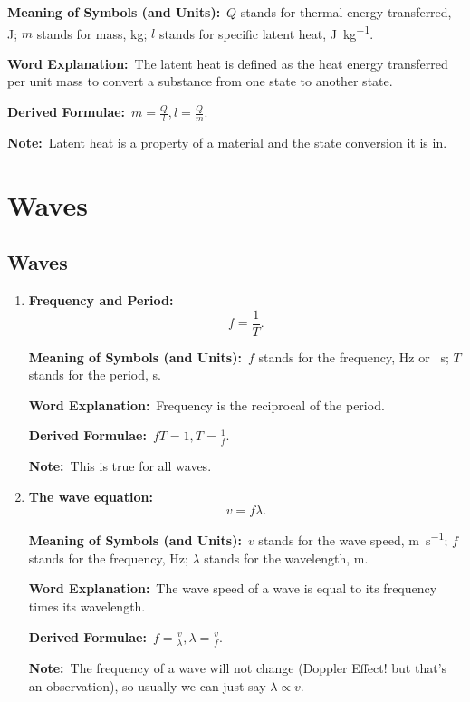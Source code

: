 \documentclass[8pt]{article}
\newcommand{\MeanSymb}{\textbf{Meaning of Symbols (and Units):}\ }
\newcommand{\WordExpl}{\textbf{Word Explanation:}\ }
\newcommand{\DeriForm}{\textbf{Derived Formulae:}\ }
\newcommand{\Note}{\textbf{Note:}\ }
\begin{document}
\begin{enumerate}
                \MeanSymb \(Q\) stands for thermal energy transferred, \unit{\joule}; \(m\) stands for mass, \unit{\kilogram}; \(l\) stands for specific latent heat, \unit{\joule \per \kilogram}.

                \WordExpl The latent heat is defined as the heat energy transferred per unit mass to convert a substance from one state to another state.

                \DeriForm \(m = \frac{Q}{l}, l = \frac{Q}{m}\).

                \Note Latent heat is a property of a material and the state conversion it is in.
                
            \end{enumerate}

    \section{Waves}
        \subsection{Waves}
            \begin{enumerate}
                \item \textbf{Frequency and Period:}
                \[
                    f = \frac{1}{T}.
                \]

                \MeanSymb \(f\) stands for the frequency, \unit{\hertz} or \unit{\per \second}; \(T\) stands for the period, \unit{\second}.

                \WordExpl Frequency is the reciprocal of the period.

                \DeriForm \(fT = 1, T = \frac{1}{f}\).

                \Note This is true for all waves.

                \item \textbf{The wave equation:}
                \[
                    v = f \lambda.
                \]

                \MeanSymb \(v\) stands for the wave speed, \unit{\metre \per \second}; \(f\) stands for the frequency, \unit{\hertz}; \(\lambda\) stands for the wavelength, \unit{\metre}.

                \WordExpl The wave speed of a wave is equal to its frequency times its wavelength.

                \DeriForm \(f = \frac{v}{\lambda}, \lambda = \frac{v}{f}\).

                \Note The frequency of a wave will not change (Doppler Effect! but that's an observation), so usually we can just say \(\lambda \propto v\).
            \end{enumerate}
\end{document}
